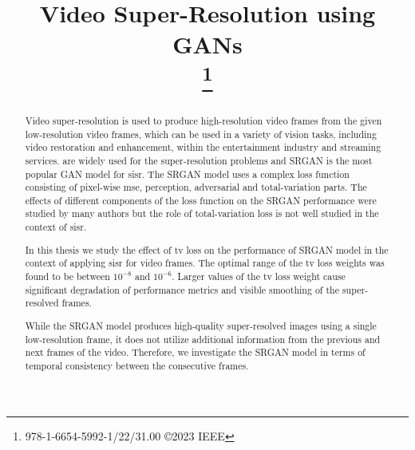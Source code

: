 \documentclass[conference]{IEEEtran}
\begin{document}
\title{Video Super-Resolution using GANs\\
\thanks{978-1-6654-5992-1/22/31.00 ©2023 IEEE}
}

\author{
}

\graphicspath{{./img/}}

\maketitle


\begin{abstract}
    Video super-resolution is used to produce high-resolution video frames from the given low-resolution video frames, which can be used in a variety of vision tasks, including video restoration and enhancement, within the entertainment industry and streaming services.  are widely used for the super-resolution problems and SRGAN \cite{srgan_2016} is the most popular GAN model for \acrfull{sisr}. The SRGAN model uses a complex loss function consisting of pixel-wise \acrfull{mse}, perception, adversarial and total-variation parts. The effects of different components of the loss function on the SRGAN performance were studied by many authors \cite{esrgan_2018,srgan_2016,weighted_srgan_2021} but the role of total-variation loss is not well studied in the context of \acrshort{sisr}.

    In this thesis we study the effect of \acrfull{tv} loss on the performance of SRGAN model in the context of applying \acrlong{sisr} for video frames. The optimal range of the \acrshort{tv} loss weights was found to be between $10^{-8}$ and $10^{-6}$. Larger values of the \acrshort{tv} loss weight cause significant degradation of performance metrics and visible smoothing of the super-resolved frames.

    While the SRGAN model produces high-quality super-resolved images using a single low-resolution frame, it does not utilize additional information from the previous and next frames of the video. Therefore, we investigate the SRGAN model in terms of temporal consistency between the consecutive frames.

\end{abstract}
\end{document}
